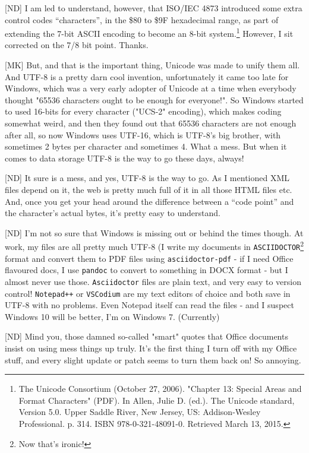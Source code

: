 [ND] I am led to understand, however, that ISO/IEC 4873 introduced some extra control codes ``characters'', in the \$80 to \$9F hexadecimal range, as part of extending the 7-bit ASCII encoding to become an 8-bit system.\footnote{The Unicode Consortium (October 27, 2006). "Chapter 13: Special Areas and Format Characters" (PDF). In Allen, Julie D. (ed.). The Unicode standard, Version 5.0. Upper Saddle River, New Jersey, US: Addison-Wesley Professional. p. 314. ISBN 978-0-321-48091-0. Retrieved March 13, 2015.} However, I sit corrected on the 7/8 bit point. Thanks.


[MK] But, and that is the important thing, Unicode was made to unify them
all. And UTF-8 is a pretty darn cool invention, unfortunately it came
too late for Windows, which was a very early adopter of Unicode at a
time when everybody thought "65536 characters ought to be enough for
everyone!". So Windows started to used 16-bits for every character
("UCS-2" encoding), which makes coding somewhat weird, and then they
found out that 65536 characters are not enough after all, so now
Windows uses UTF-16, which is UTF-8's big brother, with sometimes 2
bytes per character and sometimes 4. What a mess. But when it comes to
data storage UTF-8 is the way to go these days, always!

[ND] It sure is a mess, and yes, UTF-8 is the way to go. As I mentioned XML files depend on it, the web is pretty much full of it in all those HTML files etc. And, once you get your head around the difference between a ``code point'' and the character's actual bytes, it's pretty easy to understand.

[ND] I'm not so sure that Windows is missing out or behind the times though. At work, my files are all pretty much UTF-8 (I write my documents in  \texttt{ASCIIDOCTOR}\footnote{Now that's ironic!} format and convert them to PDF files using  \texttt{asciidoctor-pdf} - if I need Office flavoured docs, I use  \texttt{pandoc} to convert to something in DOCX format - but I almost never use those.  \texttt{Asciidoctor} files are plain text, and very easy to version control!  \texttt{Notepad++} or  \texttt{VSCodium} are my text editors of choice and both save in UTF-8 with no problems. Even Notepad itself can read the files - and I suspect Windows 10 will be better, I'm on Windows 7. (Currently)

[ND] Mind you, those damned so-called "smart" quotes that Office documents insist on using mess things up truly. It's the first thing I turn off with my Office stuff, and every slight update or patch seems to turn them back on! So annoying.

